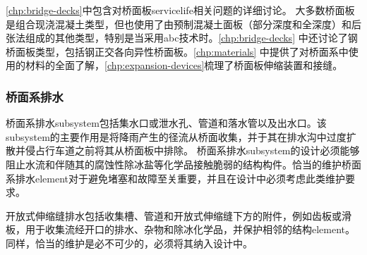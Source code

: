 \cref{chp:bridge-decks}中包含对桥面板\gls*{servicelife}相关问题的详细讨论。 大多数桥面板是组合现浇混凝土类型，但也使用了由预制混凝土面板（部分深度和全深度）和后张法组成的其他类型，特别是当采用\acrfull{abc}技术时。\cref{chp:bridge-decks} 中还讨论了钢桥面板类型，包括钢正交各向异性桥面板。\cref{chp:materials} 中提供了对桥面系中使用的材料的全面了解，\cref{chp:expansion-devices}梳理了桥面板伸缩装置和接缝。

\subsubsection{桥面系排水}
桥面系排水\gls*{subsystem}包括集水口或泄水孔、管道和落水管以及出水口。该\gls*{subsystem}的主要作用是将降雨产生的径流从桥面收集，并于其在排水沟中过度扩散并侵占行车道之前将其从桥面板中排除。 桥面系排水\gls*{subsystem}的设计必须能够阻止水流和伴随其的腐蚀性除冰盐等化学品接触脆弱的结构构件。恰当的维护桥面系排水\gls{element}对于避免堵塞和故障至关重要，并且在设计中必须考虑此类维护要求。

开放式伸缩缝排水包括收集槽、管道和开放式伸缩缝下方的附件，例如齿板或滑板，用于收集流经开口的排水、杂物和除冰化学品，并保护相邻的结构\gls*{element}。同样，恰当的维护是必不可少的，必须将其纳入设计中。

